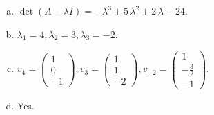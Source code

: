 \begin{questions}
\begin{solution}
\begin{enumerate}[(a)]
\item $\det(A-\lambda I)=-{\lambda}^{3} + 5 \, {\lambda}^{2} + 2 \, {\lambda} - 24$.
\item ${\lambda}_1=4, {\lambda}_2=3, {\lambda}_3=-2$.
\item $v_{4}=\left(\begin{array}{r}
1 \\
0 \\
-1
\end{array}\right), v_{3}=\left(\begin{array}{r}
1 \\
1 \\
-2
\end{array}\right), v_{-2}=\left(\begin{array}{r}
1 \\
-\frac{3}{2} \\
-1
\end{array}\right)$.
\item Yes.
\end{enumerate}
\end{solution}

\end{questions}

\newpage


\begin{center}
\end{center}

